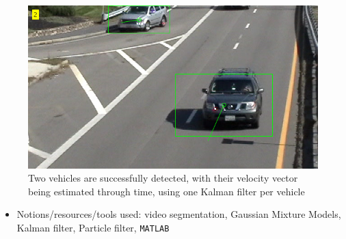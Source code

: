 \begin{figure}[H]\centering
  \includegraphics[scale=0.55]{images/kf_1.png}
  \caption{\small Two vehicles are successfully detected, with their velocity
           vector being estimated through time, using one Kalman filter per
           vehicle}
  \label{fig:kf_1}
\end{figure}

\begin{itemize}
\item Notions/resources/tools used: video segmentation, Gaussian Mixture Models, Kalman filter,
  Particle filter, \texttt{MATLAB}
\end{itemize}
